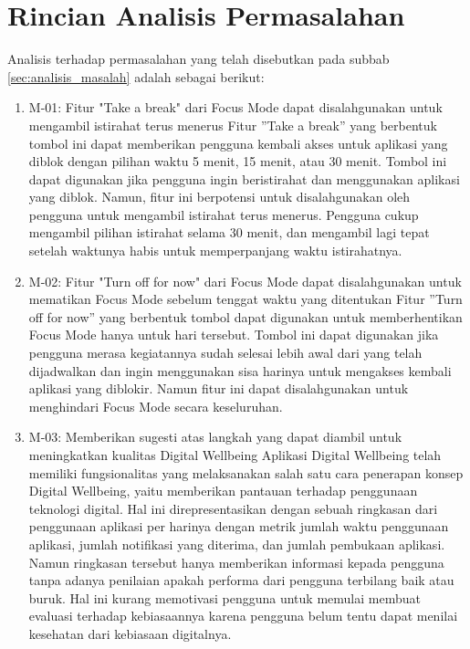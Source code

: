 \chapter{Rincian Analisis Permasalahan}
\label{chpt:rincian_analisis_permasalahan}

Analisis terhadap permasalahan yang telah disebutkan pada subbab \ref{sec:analisis_masalah} adalah sebagai berikut:

\begin{enumerate}
  \item M-01: Fitur "Take a break" dari Focus Mode dapat disalahgunakan untuk mengambil istirahat terus menerus
  \subitem Fitur ”Take a break” yang berbentuk tombol ini dapat memberikan pengguna kembali akses untuk aplikasi yang diblok dengan pilihan waktu 5 menit, 15 menit, atau 30 menit. Tombol ini dapat digunakan jika pengguna ingin beristirahat dan menggunakan aplikasi yang diblok. Namun, fitur ini berpotensi untuk disalahgunakan oleh pengguna untuk mengambil istirahat terus menerus. Pengguna cukup mengambil pilihan istirahat selama 30 menit, dan mengambil lagi tepat setelah waktunya habis untuk memperpanjang waktu istirahatnya.
  
  \item M-02: Fitur "Turn off for now" dari Focus Mode dapat disalahgunakan untuk mematikan Focus Mode sebelum tenggat waktu yang ditentukan
  \subitem Fitur ”Turn off for now” yang berbentuk tombol dapat digunakan untuk memberhentikan Focus Mode hanya untuk hari tersebut. Tombol ini dapat digunakan jika pengguna merasa kegiatannya sudah selesai lebih awal dari yang telah dijadwalkan dan ingin menggunakan sisa harinya untuk mengakses kembali aplikasi yang diblokir. Namun fitur ini dapat disalahgunakan untuk menghindari Focus Mode secara keseluruhan.
   
  \item M-03: Memberikan sugesti atas langkah yang dapat diambil untuk meningkatkan kualitas Digital Wellbeing
  \subitem Aplikasi Digital Wellbeing telah memiliki fungsionalitas yang melaksanakan salah satu cara penerapan konsep Digital Wellbeing, yaitu memberikan pantauan terhadap penggunaan teknologi digital. Hal ini direpresentasikan dengan sebuah ringkasan dari penggunaan aplikasi per harinya dengan metrik jumlah waktu penggunaan aplikasi, jumlah notifikasi yang diterima, dan jumlah pembukaan aplikasi. Namun ringkasan tersebut hanya memberikan informasi kepada pengguna tanpa adanya penilaian apakah performa dari pengguna terbilang baik atau buruk. Hal ini kurang memotivasi pengguna untuk memulai membuat evaluasi terhadap kebiasaannya karena pengguna belum tentu dapat menilai kesehatan dari kebiasaan digitalnya.
   
\end{enumerate}